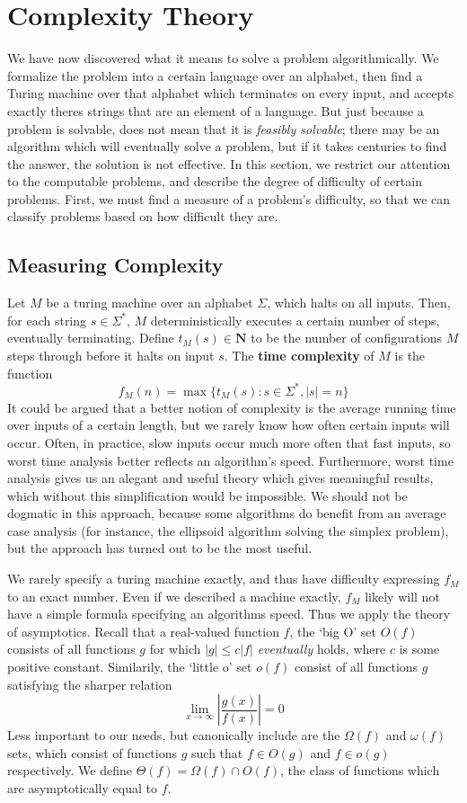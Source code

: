 \chapter{Complexity Theory}

We have now discovered what it means to solve a problem algorithmically. We formalize the problem into a certain language over an alphabet, then find a Turing machine over that alphabet which terminates on every input, and accepts exactly theres strings that are an element of a language. But just because a problem is solvable, does not mean that it is {\it feasibly solvable}; there may be an algorithm which will eventually solve a problem, but if it takes centuries to find the answer, the solution is not effective. In this section, we restrict our attention to the computable problems, and describe the degree of difficulty of certain problems. First, we must find a measure of a problem's difficulty, so that we can classify problems based on how difficult they are.

\section{Measuring Complexity}

Let $M$ be a turing machine over an alphabet $\Sigma$, which halts on all inputs. Then, for each string $s \in \Sigma^*$, $M$ deterministically executes a certain number of steps, eventually terminating. Define $t_M(s) \in \mathbf{N}$ to be the number of configurations $M$ steps through before it halts on input $s$. The {\bf time complexity} of $M$ is the function
%
\[ f_M(n) = \max \{ t_M(s): s \in \Sigma^*, |s| = n \} \]
%
It could be argued that a better notion of complexity is the average running time over inputs of a certain length, but we rarely know how often certain inputs will occur. Often, in practice, slow inputs occur much more often that fast inputs, so worst time analysis better reflects an algorithm's speed. Furthermore, worst time analysis gives us an alegant and useful theory which gives meaningful results, which without this simplification would be impossible. We should not be dogmatic in this approach, because some algorithms do benefit from an average case analysis (for instance, the ellipsoid algorithm solving the simplex problem), but the approach has turned out to be the most useful.

We rarely specify a turing machine exactly, and thus have difficulty expressing $f_M$ to an exact number. Even if we described a machine exactly, $f_M$ likely will not have a simple formula specifying an algorithms speed. Thus we apply the theory of asymptotics. Recall that a real-valued function $f$, the `big O' set $O(f)$ consists of all functions $g$ for which $|g| \leq c|f|$ {\it eventually} holds, where $c$ is some positive constant. Similarily, the `little o' set $o(f)$ consist of all functions $g$ satisfying the sharper relation
%
\[ \lim_{x \to \infty} \left|\frac{g(x)}{f(x)}\right| = 0 \]
%
Less important to our needs, but canonically include are the $\Omega(f)$ and $\omega(f)$ sets, which consist of functions $g$ such that $f \in O(g)$ and $f \in o(g)$ respectively. We define $\Theta(f) = \Omega(f) \cap O(f)$, the class of functions which are asymptotically equal to $f$.

